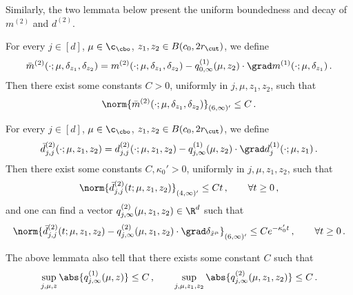 \documentclass{amsart}
\begin{document}
Similarly, the two lemmata below present the uniform boundedness and decay of $m^{(2)}$ and $d^{(2)}$.
\begin{lemma}
\label{l:m2-bound}
	For every $j \in [d]$, $\mu \in \c_\cbo$, $z_1,z_2 \in B(c_0, 2r_\cut)$, we define 
	\begin{equation*}
		\bar m^{(2)}(\cdot;\mu,\delta_{z_1},\delta_{z_2}) = m^{(2)}(\cdot;\mu,\delta_{z_1},\delta_{z_2}) - q^{(1)}_{0,\infty}(\mu,z_2) \cdot \grad m^{(1)}(\cdot;\mu,\delta_{z_1}) \,.
	\end{equation*}
	Then there exist some constants $C > 0$, uniformly in $j,\mu,z_1,z_2$, such that 
	\begin{equation*}
		\norm{\bar m^{(2)}(\cdot;\mu,\delta_{z_1},\delta_{z_2})}_{(6,\infty)'} \le C \,.
	\end{equation*}
\end{lemma}
\begin{lemma}
\label{l:d2-bound}
	For every $j \in [d]$, $\mu \in \c_\cbo$, $z_1,z_2 \in B(c_0, 2r_\cut)$, we define 
	\begin{equation*}
		\bar d^{(2)}_{j,j}(\cdot;\mu,z_1,z_2) = d^{(2)}_{j,j}(\cdot;\mu,z_1,z_2) - q^{(1)}_{j,\infty}(\mu,z_2) \cdot \grad d^{(1)}_j(\cdot;\mu,z_1) \,.
	\end{equation*}
	Then there exist some constants $C, \kappa_0' > 0$, uniformly in $j,\mu,z_1,z_2$, such that 
	\begin{equation*}
		\norm{\bar d^{(2)}_{j,j}(t;\mu,z_1,z_2)}_{(4,\infty)'} \le Ct \,,  \qquad \forall t \ge 0 \,,
	\end{equation*}
	and one can find a vector $q^{(2)}_{j,\infty}(\mu,z_1,z_2) \in \R^d$ such that 
	\begin{equation*}
		\norm{\bar d^{(2)}_{j,j}(t;\mu,z_1,z_2) - q^{(2)}_{j,\infty}(\mu,z_1,z_2) \cdot \grad \delta_{\tilde x^\mu} }_{(6,\infty)'} \le C e^{-\kappa_0' t} \,, \qquad \forall t \ge 0 \,.
	\end{equation*}
\end{lemma}

\begin{remark}
	\label{rm:q-infty-bound}
    The above lemmata also tell that there exists some constant $C$ such that 
    \begin{equation*}
        \sup_{j,\mu,z} \abs{q^{(1)}_{j,\infty}(\mu,z)} \le C \,, \qquad \sup_{j,\mu,z_1,z_2} \abs{q^{(2)}_{j,\infty}(\mu,z_1,z_2)} \le C \,.
    \end{equation*}
\end{remark}
\end{document}
